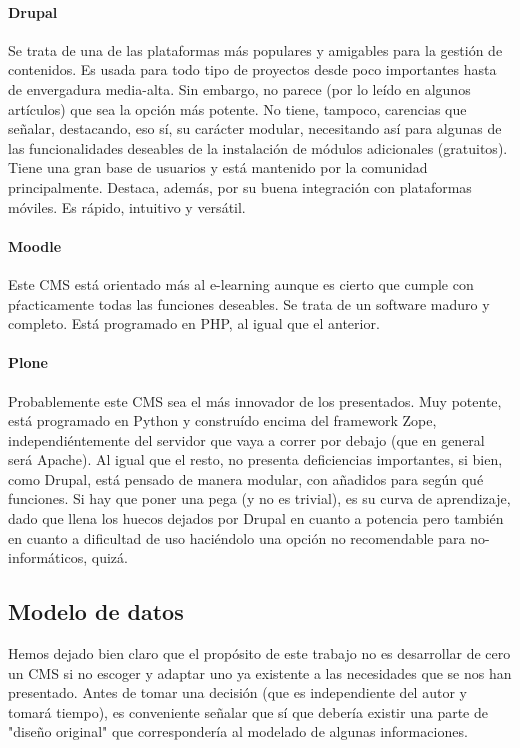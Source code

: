 \paragraph{Drupal}
\par Se trata de una de las plataformas más populares y amigables para la gestión de contenidos. Es usada para todo tipo de proyectos desde poco importantes hasta de envergadura media-alta. Sin embargo, no parece (por lo leído en algunos artículos) que sea la opción más potente.
No tiene, tampoco, carencias que señalar, destacando, eso sí, su carácter modular, necesitando así para algunas de las funcionalidades deseables de la instalación de módulos adicionales (gratuitos). Tiene una gran base de usuarios y está mantenido por la comunidad principalmente. Destaca, además, por su buena integración con plataformas móviles.
Es rápido, intuitivo y versátil.

\paragraph{Moodle}
\par Este CMS está orientado más al e-learning aunque es cierto que cumple con pŕacticamente todas las funciones deseables.
Se trata de un software maduro y completo.
Está programado en PHP, al igual que el anterior.

\paragraph{Plone}
\par Probablemente este CMS sea el más innovador de los presentados. Muy potente, está programado en Python y construído encima del framework Zope, independiéntemente del servidor que vaya a correr por debajo (que en general será Apache).
Al igual que el resto, no presenta deficiencias importantes, si bien, como Drupal, está pensado de manera modular, con añadidos para según qué funciones.
Si hay que poner una pega (y no es trivial), es su curva de aprendizaje, dado que llena los huecos dejados por Drupal en cuanto a potencia pero también en cuanto a dificultad de uso haciéndolo una opción no recomendable para no-informáticos, quizá.

\subsection{Modelo de datos}
\par Hemos dejado bien claro que el propósito de este trabajo no es desarrollar de cero un CMS si no escoger y adaptar uno ya existente a las necesidades que se nos han presentado. Antes de tomar una decisión (que es independiente del autor y tomará tiempo), es conveniente señalar que sí que debería existir una parte de "diseño original" que correspondería al modelado de algunas informaciones. 


